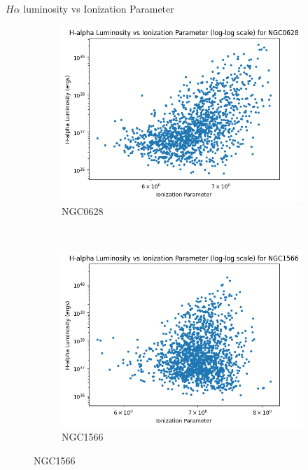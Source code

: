 \documentclass{beamer}
\begin{document}
\begin{frame}{$H\alpha$ luminosity vs Ionization Parameter}
    \begin{figure}
        \centering
        \begin{subfigure}{0.45\textwidth}
            \includegraphics[scale = 0.25]{image5.png}
            \caption{NGC0628}
        \end{subfigure}
        ~
        \begin{subfigure}{0.45\textwidth}
                \includegraphics[scale = 0.25]{image6.png}
                \caption{NGC1566}
                \label{fig:image6}
        \end{subfigure}
    \end{figure}


\end{frame}
\end{document}
